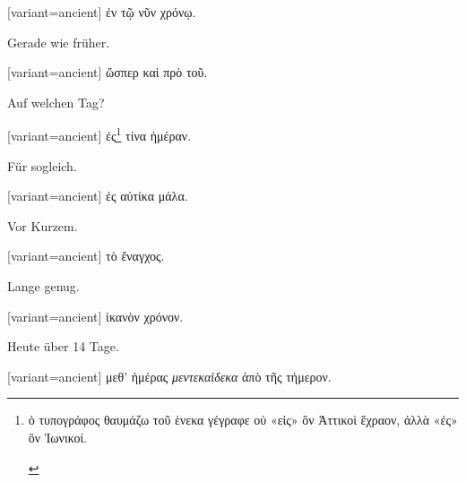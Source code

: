 \switchcolumn

\begin{greek}[variant=ancient]%
ἐν τῷ νῦν χρόνῳ.

\end{greek}%
\switchcolumn*

Gerade wie früher.

\switchcolumn

\begin{greek}[variant=ancient]%
ὥσπερ καὶ πρὸ τοῦ.

\end{greek}%
\switchcolumn*

Auf welchen Tag?

\switchcolumn

\begin{greek}[variant=ancient]%
ἐς\footnote{\begin{latin}%
\textgreek[variant=ancient]{ὁ τυπογράφος θαυμάζω τοῦ ἑνεκα γέγραφε
οὐ «εἰς» ὃν Ἀττικοὶ ἔχραον, ἀλλὰ «ἐς» ὃν Ἰωνικοί.}\end{latin}%
} τίνα ἡμέραν.

\end{greek}%
\switchcolumn*

Für sogleich.

\switchcolumn

\begin{greek}[variant=ancient]%
ἐς αὐτίκα μάλα.

\end{greek}%
\switchcolumn*

Vor Kurzem.

\switchcolumn

\begin{greek}[variant=ancient]%
τὸ ἔναγχος.

\end{greek}%
\switchcolumn*

Lange genug.

\switchcolumn

\begin{greek}[variant=ancient]%
ἰκανὸν χρόνον.

\end{greek}%
\switchcolumn*

Heute über 14 Tage.

\switchcolumn

\begin{greek}[variant=ancient]%
μεθ' ἡμέρας \emph{μεντεκαὶδεκα} ἀπὸ τῆς τήμερον.

\end{greek}%
\switchcolumn*


